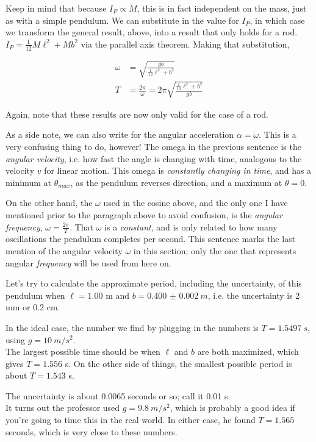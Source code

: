 Keep in mind that because $I_P \propto M$, this is in fact independent on the mass, just as with a simple pendulum. We can substitute in the value for $I_P$, in which case we transform the general result, above, into a result that only holds for a rod.\\
$I_P = \frac{1}{12} M \ell^2 + M b^2$ via the parallel axis theorem. Making that substitution,

\begin{align}
\omega    &= \sqrt{\frac{g b}{\frac{1}{12} \ell^2 + b^2}}\\
T         &= \frac{2 \pi}{\omega} = 2 \pi \sqrt{\frac{\frac{1}{12} \ell^2 + b^2}{g b}}
\end{align}

Again, note that these results are now only valid for the case of a rod.

As a side note, we can also write for the angular acceleration $\alpha = \dot{\omega}$. This is a very confusing thing to do, however! The omega in the previous sentence is the \emph{angular velocity}, i.e. how fast the angle is changing with time, analogous to the velocity $v$ for linear motion. This omega is \emph{constantly changing in time}, and has a minimum at $\theta_{max}$, as the pendulum reverses direction, and a maximum at $\theta = 0$.

On the other hand, the $\omega$ used in the cosine above, and the only one I have mentioned prior to the paragraph above to avoid confusion, is the \emph{angular frequency}, $\displaystyle \omega = \frac{2 \pi}{T}$. That $\omega$ is a \emph{constant}, and is only related to how many oscillations the pendulum completes per second. This sentence marks the last mention of the angular velocity $\omega$ in this section; only the one that represents angular \emph{frequency} will be used from here on.

Let's try to calculate the approximate period, including the uncertainty, of this pendulum when $\ell = 1.00$ m and $b = \SI{0.400(2)}{m}$, i.e. the uncertainty is 2 mm or 0.2 cm.

In the ideal case, the number we find by plugging in the numbers is $T = \SI{1.5497}{s}$, using $g = \SI{10}{m/s^2}$.\\
The largest possible time should be when $\ell$ and $b$ are both maximized, which gives $T = 1.556$ s. On the other side of things, the smallest possible period is about $T = 1.543$ s.

The uncertainty is about 0.0065 seconds or so; call it 0.01 s.\\
It turns out the professor used $g = \SI{9.8}{m/s^2}$, which is probably a good idea if you're going to time this in the real world. In either case, he found $T = 1.565$ seconds, which is very close to these numbers.

